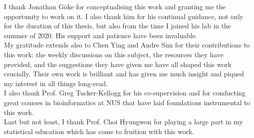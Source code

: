 
I thank Jonathan Göke for conceptualising this work and granting me the opportunity to work on it. I also thank him for his continual guidance, not only for the duration of this thesis, but also from the time I joined his lab in the summer of 2020. His support and patience have been invaluable.\\[10pt]
My gratitude extends also to Chen Ying and Andre Sim for their contributions to this work: the weekly discussions on this subject, the resources they have provided, and the suggestions they have given me have all shaped this work crucially. Their own work is brilliant and has given me much insight and piqued my interest in all things long-read.\\[10pt]
I also thank Prof. Greg Tucker-Kellogg for his co-supervision and for conducting great courses in bioinformatics at NUS that have laid foundations instrumental to this work.\\[10pt] 
Last but not least, I thank Prof. Choi Hyungwon for playing a large part in my statistical education which has come to fruition with this work.  
